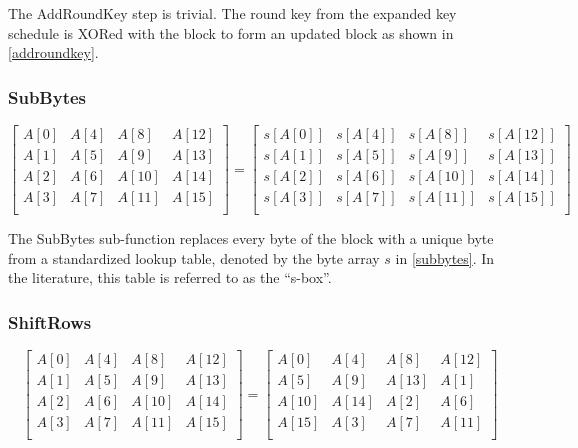 \documentclass[a4paper,10pt]{article}
\begin{document}
The AddRoundKey step is trivial.  The round key from the expanded key schedule is XORed with the block to form an updated block as shown in \eqref{addroundkey}.

\subsubsection{SubBytes}


\begin{equation}
 \begin{bmatrix}
  A[0] & A[4] & A[8] & A[12] \\
  A[1] & A[5] & A[9] & A[13] \\
  A[2] & A[6] & A[10] & A[14] \\
  A[3] & A[7] & A[11] & A[15] \\
 \end{bmatrix}
 =
 \begin{bmatrix}
  s[A[0]] & s[A[4]] & s[A[8]] & s[A[12]] \\
  s[A[1]] & s[A[5]] & s[A[9]] & s[A[13]] \\
  s[A[2]] & s[A[6]] & s[A[10]] & s[A[14]] \\
  s[A[3]] & s[A[7]] & s[A[11]] & s[A[15]] \\
 \end{bmatrix}
\label{subbytes}
\end{equation}

The SubBytes sub-function replaces every byte of the block with a unique byte from a standardized lookup table, denoted by the byte array $s$ in \eqref{subbytes}.  In the literature, this table is referred to as the ``s-box''.

\subsubsection{ShiftRows}

\begin{equation}
 \begin{bmatrix}
  A[0] & A[4] & A[8] & A[12] \\
  A[1] & A[5] & A[9] & A[13] \\
  A[2] & A[6] & A[10] & A[14] \\
  A[3] & A[7] & A[11] & A[15] \\
 \end{bmatrix}
 =
 \begin{bmatrix}
  A[0] & A[4] & A[8] & A[12] \\
  A[5] & A[9] & A[13] & A[1] \\
  A[10] & A[14] & A[2] & A[6] \\
  A[15] & A[3] & A[7] & A[11] \\
 \end{bmatrix}
\label{shiftrows}
\end{equation}
\end{document}
